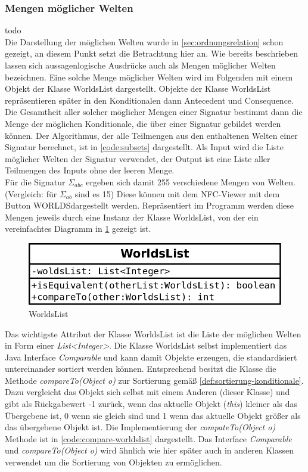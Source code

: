 \documentclass[12pt,a4paper]{article}
\begin{document}
\subsubsection{Mengen möglicher Welten}
\label{sec:worldslist}
todo\\
Die Darstellung der möglichen Welten wurde in \autoref{sec:ordnungsrelation} schon gezeigt, an diesem Punkt setzt die Betrachtung hier an. Wie bereits beschrieben lassen sich aussagenlogische Ausdrücke auch als Mengen möglicher Welten bezeichnen. Eine solche Menge möglicher Welten wird im Folgenden mit einem Objekt der Klasse WorldsList dargestellt. Objekte der Klasse WorldsList repräsentieren später in den Konditionalen dann Antecedent und Consequence. Die Gesamtheit aller solcher möglicher Mengen einer Signatur bestimmt dann die Menge der möglichen Konditionale, die über einer Signatur gebildet werden können. Der Algorithmus, der alle Teilmengen aus den enthaltenen Welten einer Signatur berechnet, ist in \autoref{code:subsets} dargestellt. Als Input wird die Liste möglicher Welten der Signatur verwendet, der Output ist eine Liste aller Teilmengen des Inputs ohne der leeren Menge. \\
Für die Signatur $\Sigma_{abc}$ ergeben sich damit 255 verschiedene Mengen von Welten. (Vergleich: für $\Sigma_{ab}$ sind es 15) Diese können mit dem NFC-Viewer mit dem Button \glqq WORLDS\grqq \space dargestellt werden. Repräsentiert im Programm werden diese Mengen jeweils durch eine Instanz der Klasse WorldsList, von der ein vereinfachtes Diagramm in \ref{pic:worldslist} gezeigt ist. 


\begin{figure}
\includegraphics[width=0.45\linewidth]{bilder/worldslist.png}
\caption{WorldsList}
\label{pic:worldslist}
\end{figure}


Das wichtigste Attribut der Klasse WorldsList ist die Liste der möglichen Welten in Form einer \textit{List<Integer>}. Die Klasse WorldsList selbst implementiert das Java Interface \textit{Comparable} und kann damit Objekte erzeugen, die standardisiert untereinander sortiert werden können. Entsprechend besitzt die Klasse die Methode \textit{compareTo(Object o)} zur Sortierung gemäß \autoref{def:sortierung-konditionale}. Dazu vergleicht das Objekt sich selbst mit einem Anderen (dieser Klasse) und gibt als Rückgabewert -1 zurück, wenn das aktuelle Objekt (\textit{this}) kleiner als das Übergebene ist, 0 wenn sie gleich sind und 1 wenn das aktuelle Objekt größer als das übergebene Objekt ist. Die Implementierung der \textit{compateTo(Object o)} Methode ist in \autoref{code:compare-worldslist} dargestellt. Das Interface  \textit{Comparable} und \textit{compareTo(Object o)} wird ähnlich wie hier später auch in anderen Klassen verwendet um die Sortierung von Objekten zu ermöglichen.
\end{document}
